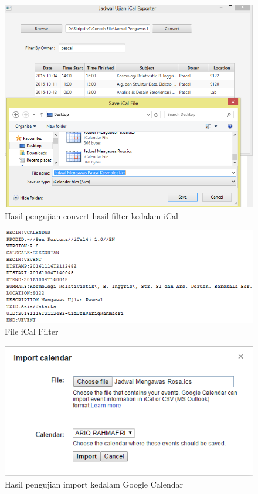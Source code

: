 		\begin{figure}[H]
		\centering
		\includegraphics[scale=0.6]{Gambar/filterKonvertiCalEksperimental}
		\caption{Hasil pengujian convert hasil filter kedalam iCal}
		\label{fig:filterKonvertiCaEksperimentall}
		\end{figure}
		
		\begin{figure}[H]
		\centering
		\includegraphics[scale=0.7]{Gambar/fileiCalFilterEksperimental}
		\caption{File iCal Filter}
		\label{fig:fileiCalFilterEksperimental}
		\end{figure}
	 
		\begin{figure}[H]
		\centering
		\includegraphics[scale=0.8]{Gambar/importGCEksperimental}
		\caption{Hasil pengujian import kedalam Google Calendar}
		\label{fig:importGC}
		\end{figure}
		
